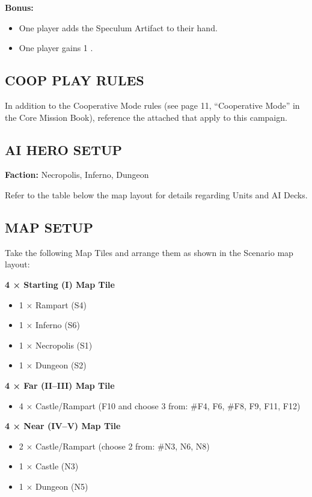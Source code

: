 \begin{multicols*}{2}
\columnbreak
\textbf{Bonus:}
\begin{itemize}
  \item One player adds the Speculum Artifact to their hand.
  \item One player gains 1 .
\end{itemize}

\subsection*{\MakeUppercase{Coop Play Rules}}

In addition to the Cooperative Mode rules (see page 11, ``Cooperative Mode'' in the Core Mission Book), reference the attached  that apply to this campaign.

\subsection*{\MakeUppercase{AI Hero Setup}}

\textbf{Faction:} Necropolis, Inferno, Dungeon

Refer to the table below the map layout for details regarding Units and AI Decks.

\subsection*{\MakeUppercase{Map Setup}}

Take the following Map Tiles and arrange them as shown in the Scenario map layout:

\textbf{4 × Starting (I) Map Tile}
\begin{itemize}
  \item 1 × Rampart (S4)
  \item 1 × Inferno (S6)
  \item 1 × Necropolis (S1)
  \item 1 × Dungeon (S2)
\end{itemize}

\textbf{4 × Far (II--III) Map Tile}
\begin{itemize}
  \item 4 × Castle/Rampart (F10 and choose 3 from: \#F4, F6, \#F8, F9, F11, F12)
\end{itemize}

\textbf{4 × Near (IV--V) Map Tile}
\begin{itemize}
  \item 2 × Castle/Rampart (choose 2 from: \#N3, N6, N8)
  \item 1 × Castle (N3)
  \item 1 × Dungeon (N5)
\end{itemize}


\end{multicols*}

